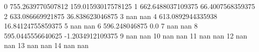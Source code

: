 0 755.2639770507812 159.01593017578125
1 662.6488037109375 66.4007568359375
2 633.086669921875 36.838623046875
3 nan nan
4 613.0892944335938 16.84124755859375
5 nan nan
6 596.248046875 0.0
7 nan nan
8 595.0445556640625 -1.2034912109375
9 nan nan
10 nan nan
11 nan nan
12 nan nan
13 nan nan
14 nan nan
